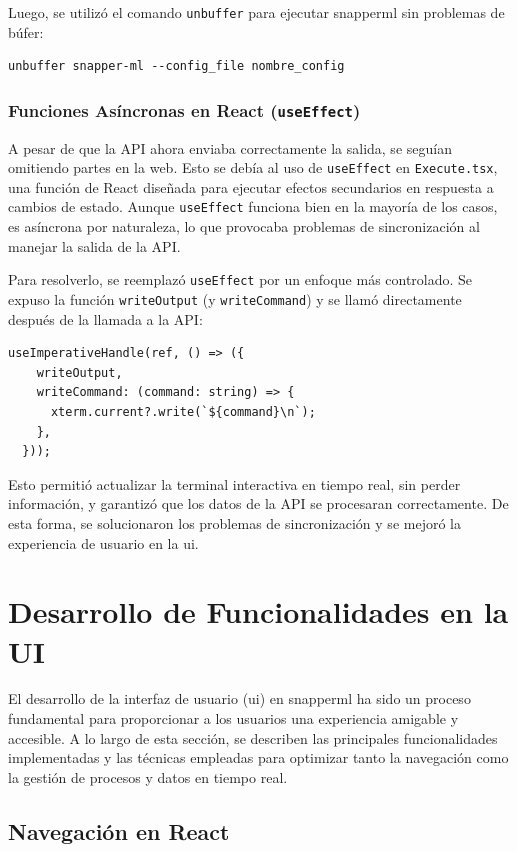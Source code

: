 Luego, se utilizó el comando \texttt{unbuffer} para ejecutar \Gls{snapperml} sin problemas de búfer:
\begin{verbatim} 
unbuffer snapper-ml --config_file nombre_config 
\end{verbatim}

\subsubsection{Funciones Asíncronas en React (\texttt{useEffect})}
A pesar de que la API ahora enviaba correctamente la salida, se seguían omitiendo partes en la web. Esto se debía al uso de \texttt{useEffect} en \texttt{Execute.tsx}, una función de React diseñada para ejecutar efectos secundarios en respuesta a cambios de estado. Aunque \texttt{useEffect} funciona bien en la mayoría de los casos, es asíncrona por naturaleza, lo que provocaba problemas de sincronización al manejar la salida de la API.

Para resolverlo, se reemplazó \texttt{useEffect} por un enfoque más controlado. Se expuso la función \texttt{writeOutput} (y \texttt{writeCommand}) y se llamó directamente después de la llamada a la API:

\begin{verbatim} 
useImperativeHandle(ref, () => ({
    writeOutput,
    writeCommand: (command: string) => {
      xterm.current?.write(`${command}\n`);
    },
  }));
\end{verbatim}

Esto permitió actualizar la terminal interactiva en tiempo real, sin perder información, y garantizó que los datos de la API se procesaran correctamente. De esta forma, se solucionaron los problemas de sincronización y se mejoró la experiencia de usuario en la \acrshort{ui}.

\section{Desarrollo de Funcionalidades en la UI}
El desarrollo de la interfaz de usuario (\acrshort{ui}) en \Gls{snapperml} ha sido un proceso fundamental para proporcionar a los usuarios una experiencia amigable y accesible. A lo largo de esta sección, se describen las principales funcionalidades implementadas y las técnicas empleadas para optimizar tanto la navegación como la gestión de procesos y datos en tiempo real.
\subsection{Navegación en React}

